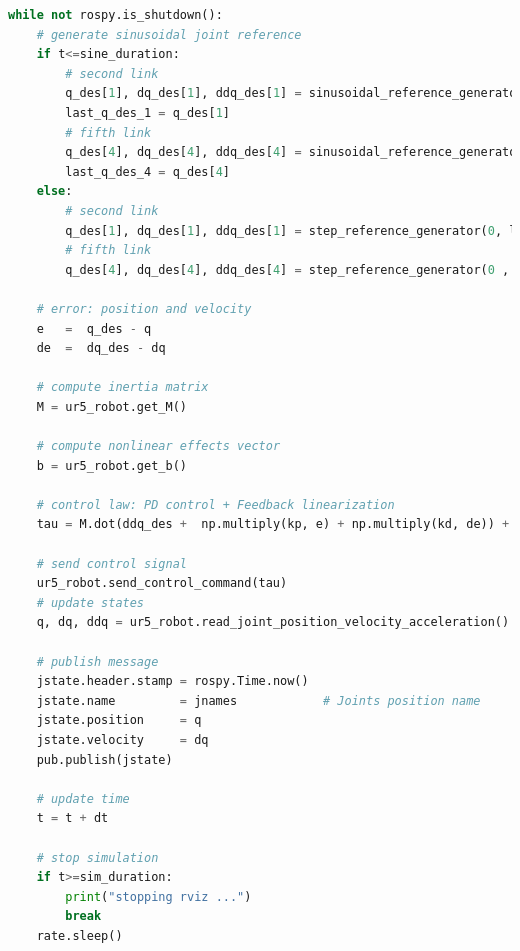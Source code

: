 \begin{lstlisting}[language=Python,caption={Move the second and fifth joint of UR5 robot with the required movement of activity 2.3.}, label={lst:inverse_dynamics_control_low_gains}]
while not rospy.is_shutdown():
    # generate sinusoidal joint reference
    if t<=sine_duration:
        # second link
        q_des[1], dq_des[1], ddq_des[1] = sinusoidal_reference_generator(q0[1], 0.2, 1, t)
        last_q_des_1 = q_des[1]
        # fifth link
        q_des[4], dq_des[4], ddq_des[4] = sinusoidal_reference_generator(q0[4], 0.4, 1.5, t)  
        last_q_des_4 = q_des[4]  
    else:
        # second link
        q_des[1], dq_des[1], ddq_des[1] = step_reference_generator(0, last_q_des_1)
        # fifth link
        q_des[4], dq_des[4], ddq_des[4] = step_reference_generator(0 , last_q_des_4)

    # error: position and velocity
    e 	=  q_des - q
    de 	=  dq_des - dq    

    # compute inertia matrix
    M = ur5_robot.get_M()

    # compute nonlinear effects vector
    b = ur5_robot.get_b()   

    # control law: PD control + Feedback linearization
    tau = M.dot(ddq_des +  np.multiply(kp, e) + np.multiply(kd, de)) + b
    
    # send control signal
    ur5_robot.send_control_command(tau)
    # update states
    q, dq, ddq = ur5_robot.read_joint_position_velocity_acceleration()

    # publish message
    jstate.header.stamp = rospy.Time.now()
    jstate.name 		= jnames			# Joints position name
    jstate.position 	= q
    jstate.velocity 	= dq
    pub.publish(jstate)

    # update time
    t = t + dt

    # stop simulation
    if t>=sim_duration:
        print("stopping rviz ...")
        break
    rate.sleep()
\end{lstlisting}

